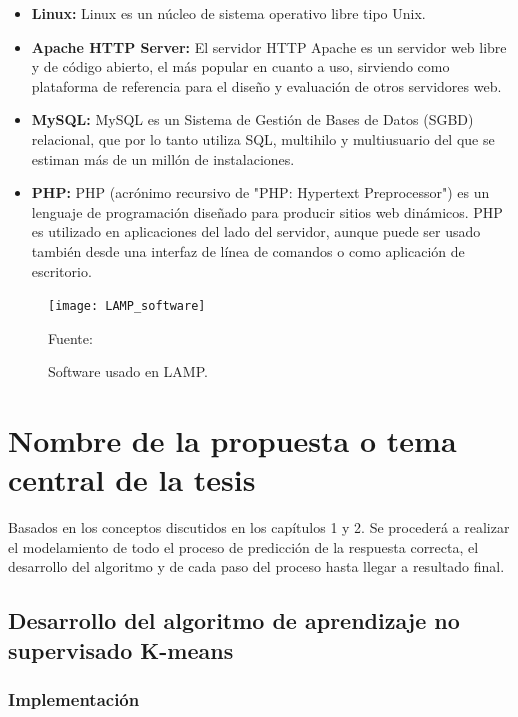 \begin{itemize}
	\item \textbf{Linux:} Linux es un núcleo de sistema operativo libre tipo Unix.
	\item \textbf{Apache HTTP Server:} El servidor HTTP Apache es un servidor web libre y de código abierto, el más popular en cuanto a uso, sirviendo como plataforma de referencia para el diseño y evaluación de otros servidores web.
	\item \textbf{MySQL:} MySQL es un Sistema de Gestión de Bases de Datos (SGBD) relacional, que por 	lo tanto utiliza SQL, multihilo y multiusuario del que se estiman más de un millón de instalaciones.
	\item \textbf{PHP:} PHP (acrónimo recursivo de "PHP: Hypertext Preprocessor") es un lenguaje de programación diseñado para producir sitios web dinámicos. PHP es utilizado en aplicaciones del lado del servidor, aunque puede ser usado también desde una interfaz de línea de comandos o como aplicación de escritorio.
\end{itemize}

\begin{figure}[ht]
	\begin{center}
		\texttt{[image: LAMP\_software]}
	\end{center}
	\begin{center}
		\vskip -0.5cm
		\caption{\small{Software usado en LAMP.}}
		{\small{Fuente: }}
	\end{center}
\end{figure}



\chapter{Nombre de la propuesta o tema central de la tesis}

Basados en los conceptos discutidos en los capítulos 1 y 2. Se procederá a realizar el modelamiento de todo el proceso de predicción de la respuesta correcta, el desarrollo del algoritmo y de cada paso del proceso hasta llegar a resultado final.

\section{Desarrollo del algoritmo de aprendizaje no supervisado K-means} 

\subsection{Implementación}

